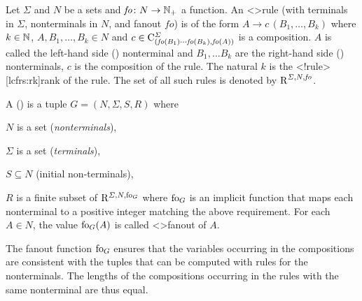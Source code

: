 \documentclass[../../document.tex]{subfiles}
\begin{document}
    \begin{definition}
        Let \(\varSigma\) and \(N\) be a sets and \(\mathit{fo}\colon N \to \mathbb{N}_+\) a function.
        An  <\lcfrs>{rule} (with terminals in \(\varSigma\), nonterminals in \(N\), and fanout \(\mathit{fo}\)) is of the form \(A \to c\,(B_1, \ldots, B_k)\) where \(k \in \mathbb{N}\), \(A, B_1, \ldots, B_k \in N\) and \(c \in \mathrm{C}^\varSigma_{(\mathit{fo}(B_1) \cdots \mathit{fo}(B_k), \mathit{fo}(A))}\) is a composition.
        \(A\) is called the left-hand side () nonterminal and \(B_1, \ldots B_k\) are the right-hand side () nonterminals, \(c\) is the composition of the rule.
        The natural \(k\) is the <\lcfrs!rule>[lcfrs:rk]{rank} of the rule.
        The set of all such  rules is denoted by \(\operatorname{R}^{\varSigma, N, \mathit{fo}}\).

        A  ()%
        is a tuple \(G=(N, \varSigma, S, R)\) where
        \begin{compactenum}
            \item \(N\) is a set (\emph{nonterminals}),
            \item \(\varSigma\) is a set (\emph{terminals}),
            \item \(S \subseteq N\) (initial non-terminals),
            \item \(R\) is a finite subset of \(\mathrm R^{\varSigma, N, \operatorname{fo}_G}\) where \(\operatorname{fo}_G\) is an implicit function that maps each nonterminal to a positive integer matching the above requirement. For each \(A \in N\), the value \(\operatorname{fo}_G(A)\) is called <\lcfrs>{fanout} of \(A\).
        \end{compactenum}
    \end{definition}

    The fanout function \(\operatorname{fo}_G\) ensures that the variables occurring in the compositions are consistent with the tuples that can be computed with rules for the  nonterminals.
    The lengths of the compositions occurring in the rules with the same  nonterminal are thus equal.
\end{document}
